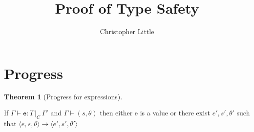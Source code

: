 \documentclass[a4paper]{article}
\theoremstyle{definition}
\theoremstyle{dotless}
\newtheorem{theorem}{Theorem}[section]
\begin{document}
\title{Proof of Type Safety}
\author{Christopher Little}
\maketitle

\section{Progress}
\newcommand{\typable}[2][ ]{\Gamma{}\vdash\mathtt{#2}\, |_C#1\:\Gamma#1'}
\newcommand{\typed}[2]{\Gamma{}\vdash\mathtt{#1}: #2\,|_C\:\Gamma'}
\newcommand{\transition}[6]{\langle{}#1,#2,#3\rangle{}\rightarrow{}\langle{}#4,#5,#6\rangle}
\newcommand{\indHyp}{\Phi(\Gamma, m, C, \Gamma')}
\newcommand{\indHypTwo}{\Psi(\Gamma, e, T, C, \Gamma')}
\newcommand{\var}{\textbf{var}}
\newcommand{\sub}[1]{\textsubscript{#1}}

\begin{theorem}[Progress for expressions]\label{expProgress}

  If $\typed{e}{T}$ and $\Gamma \vdash (s, \theta)$ then either e is a
  value or there exist $e',s', \theta'$ such that $\transition{e}{s}{\theta}{e'}{s'}{\theta'}$

\end{theorem}
\end{document}

